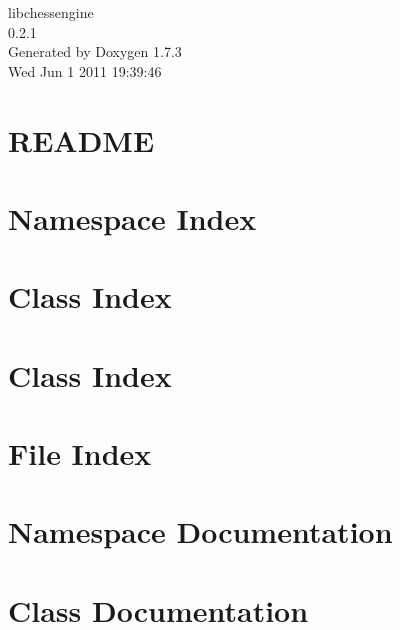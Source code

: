 \documentclass[a4paper]{book}
\begin{document}
\hypersetup{pageanchor=false}
\begin{titlepage}
\vspace*{7cm}
\begin{center}
{\Large libchessengine \\[1ex]\large 0.2.1 }\\
\vspace*{1cm}
{\large Generated by Doxygen 1.7.3}\\
\vspace*{0.5cm}
{\small Wed Jun 1 2011 19:39:46}\\
\end{center}
\end{titlepage}
\clearemptydoublepage
{}
\tableofcontents
\clearemptydoublepage
{}
\hypersetup{pageanchor=true}
\chapter{README}
\label{README}
\hypertarget{README}{}

\chapter{Namespace Index}

\chapter{Class Index}

\chapter{Class Index}

\chapter{File Index}

\chapter{Namespace Documentation}


\chapter{Class Documentation}






























\end{document}
